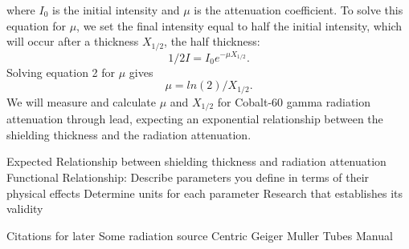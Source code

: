 where $I_0$ is the initial intensity and $\mu$ is the attenuation coefficient. To solve this equation for $\mu$, we set the final intensity equal to half the initial intensity, which will occur after a thickness $X_{1/2}$, the half thickness:
\begin{equation}
1/2 I = I_0e^{-\mu X_{1/2}}.
\end{equation}
Solving equation 2 for $\mu$ gives
\begin{equation}
\mu = ln(2)/{X_{1/2}}.
\end{equation}
We will measure and calculate $\mu$ and $X_{1/2}$ for Cobalt-60 gamma radiation attenuation through lead, expecting an exponential relationship between the shielding thickness and the radiation attenuation.



Expected Relationship between shielding thickness and radiation attenuation
Functional Relationship:
Describe parameters you define in terms of their physical effects
Determine units for each parameter
Research that establishes its validity

Citations for later
Some radiation source
Centric Geiger Muller Tubes Manual